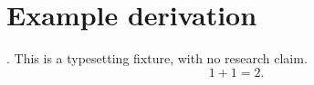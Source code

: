 \documentclass{article}
\begin{document}
\section*{Example derivation}
\fixturetext. This is a typesetting fixture, with no research claim.
\[
1 + 1 = 2.
\]
\end{document}
